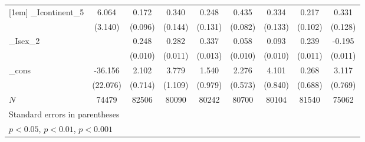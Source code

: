 {\begin{tabular}{l*{8}{c}}
[1em]
\_Icontinent\_5&       6.064         &       0.172         &       0.340\sym{*}  &       0.248         &       0.435\sym{***}&       0.334\sym{*}  &       0.217\sym{*}  &       0.331\sym{**} \\
            &     (3.140)         &     (0.096)         &     (0.144)         &     (0.131)         &     (0.082)         &     (0.133)         &     (0.102)         &     (0.128)         \\
[1em]
\_Isex\_2     &                     &       0.248\sym{***}&       0.282\sym{***}&       0.337\sym{***}&       0.058\sym{***}&       0.093\sym{***}&       0.239\sym{***}&      -0.195\sym{***}\\
            &                     &     (0.010)         &     (0.011)         &     (0.013)         &     (0.010)         &     (0.010)         &     (0.011)         &     (0.011)         \\
[1em]
\_cons      &     -36.156         &       2.102\sym{**} &       3.779\sym{***}&       1.540         &       2.276\sym{***}&       4.101\sym{***}&       0.268         &       3.117\sym{***}\\
            &    (22.076)         &     (0.714)         &     (1.109)         &     (0.979)         &     (0.573)         &     (0.840)         &     (0.688)         &     (0.769)         \\
\hline
\(N\)       &       74479         &       82506         &       80090         &       80242         &       80700         &       80104         &       81540         &       75062         \\
\hline\hline
\multicolumn{9}{l}{\footnotesize Standard errors in parentheses}\\
\multicolumn{9}{l}{\footnotesize \sym{*} \(p<0.05\), \sym{**} \(p<0.01\), \sym{***} \(p<0.001\)}\\
\end{tabular}
}
